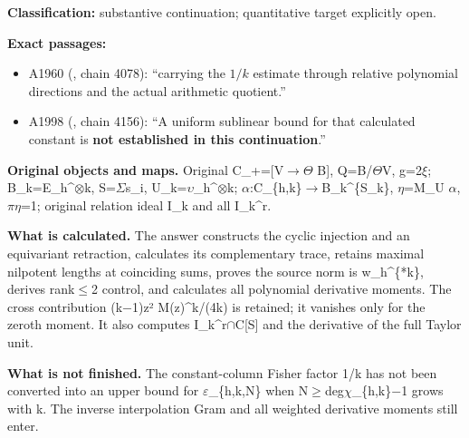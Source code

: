 \documentclass[10pt,a4paper,oneside]{report}
\providecommand{\tightlist}{\setlength{\itemsep}{0pt}\setlength{\parskip}{0pt}}
\begin{document}
\textbf{Classification:} substantive continuation; quantitative target
explicitly open.

\textbf{Exact passages:}

\begin{itemize}
\tightlist
\item
  A1960 (\protect{}, chain
  4078): ``carrying the \(1/k\) estimate through relative polynomial
  directions and the actual arithmetic quotient.''
\item
  A1998 (\protect{}, chain
  4156): ``A uniform sublinear bound for that calculated constant is
  \textbf{not established in this continuation}.''
\end{itemize}

\textbf{Original objects and maps.} Original
C\_+=[V\allowbreak{}\ensuremath{→}\allowbreak{}\allowbreak{}\ensuremath{Θ}\allowbreak{}
B{]}, Q=B/\allowbreak{}\ensuremath{Θ}\allowbreak{}V,
g=2\allowbreak{}\ensuremath{ξ}\allowbreak{};
B\_k=E\_h\textasciicircum{}\allowbreak{}\ensuremath{⊗}\allowbreak{}k,
S=\allowbreak{}\ensuremath{Σ}\allowbreak{}s\_i,
U\_k=\allowbreak{}\ensuremath{υ}\allowbreak{}\_h\textasciicircum{}\allowbreak{}\ensuremath{⊗}\allowbreak{}k;
\allowbreak{}\ensuremath{α}\allowbreak{}:C\_\{h,k\}\allowbreak{}\ensuremath{→}\allowbreak{}B\_k\textasciicircum{}\{S\_k\},
\allowbreak{}\ensuremath{η}\allowbreak{}=M\_U
\allowbreak{}\ensuremath{α}\allowbreak{},
\allowbreak{}\ensuremath{π}\allowbreak{}\allowbreak{}\ensuremath{η}\allowbreak{}=1;
original relation ideal I\_k and all I\_k\^{}r.

\textbf{What is calculated.} The answer constructs the cyclic injection
and an equivariant retraction, calculates its complementary trace,
retains maximal nilpotent lengths at coinciding sums, proves the source
norm is w\_h\^{}\{*k\}, derives
rank\allowbreak{}\ensuremath{≤}\allowbreak{}2 control, and calculates
all polynomial derivative moments. The cross contribution
(k\allowbreak{}\ensuremath{−}\allowbreak{}1)z² M(z)\^{}k/(4k) is
retained; it vanishes only for the zeroth moment. It also computes
I\_k\textasciicircum{}r\allowbreak{}\ensuremath{∩}\allowbreak{}C[S] and
the derivative of the full Taylor unit.

\textbf{What is not finished.} The constant-column Fisher factor 1/k has
not been converted into an upper bound for
\allowbreak{}\ensuremath{ε}\allowbreak{}\_\{h,k,N\} when
N\allowbreak{}\ensuremath{≥}\allowbreak{}deg\allowbreak{}\ensuremath{χ}\allowbreak{}\_\{h,k\}\allowbreak{}\ensuremath{−}\allowbreak{}1
grows with k. The inverse interpolation Gram and all weighted derivative
moments still enter.
\end{document}
